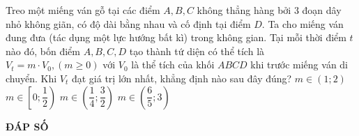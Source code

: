 \begin{ex}%
	Treo một miếng ván gỗ tại các điểm  $ A, B, C $ không thẳng hàng  bởi $ 3 $ đoạn dây nhỏ  không giãn, có độ dài bằng nhau và  cố định tại điểm  $ D $. Ta  cho miếng ván đung đưa (tác dụng một lực hướng bất kì) trong không gian. Tại mỗi thời điểm $ t $ nào đó, bốn điểm $ A, B, C, D$ tạo thành tứ diện có thể tích là $ V_t = m \cdot V_0, (m \geq 0) $ với $ V_0 $ là thể tích của khối $ ABCD $ khi trước  miếng ván di chuyển. Khi $ V_t $ đạt giá trị lớn nhất, khẳng định nào  sau đây đúng?	
	\choice
	{$ m \in (1;2) $}
	{$ m \in \left [ 0; \dfrac{1}{2} \right  ) $}
	{\True $ m \in \left ( \dfrac{1}{4}; \dfrac{3}{2} \right ) $}
	{$ m \in \left ( \dfrac{6}{5}; 3 \right ) $}
\end{ex}	

\newpage 
\begin{center}
	\textbf{ĐÁP SỐ}
\end{center}
\begin{multicols}{10}
	\setlength{\columnseprule}{0pt}
	 
\end{multicols}
